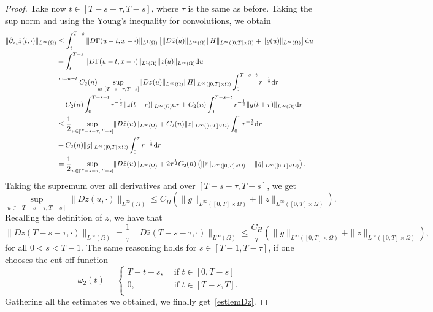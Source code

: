 \documentclass[10pt,a4paper,nouppercase,nowrite]{article}
\numberwithin{equation}{section}
\newcommand{\di}{{\rm d}}
\theoremstyle{definition}
\begin{document}
\begin{proof}
		Take now $t \in [T-s-\tau,T-s]$, where $\tau$ is the same as before. Taking the sup norm and using the Young's inequality for convolutions, we obtain
		\begin{equation*}
			\begin{split}
			\| \partial_{x_i} \bar{z}(t,\cdot) \|_{L^{\infty}(\Omega)} &\le \int_t^{T-s} \| D\Gamma(u-t,x-\cdot) \|_{L^1(\Omega)} \left[ \| D\bar{z}(u) \|_{L^{\infty}(\Omega)} \| H \|_{L^{\infty}([0,T] \times \Omega)} + \| g(u) \|_{L^{\infty}(\Omega)} \right] \di u \\
			&+\int_t^{T-s} \| D\Gamma(u-t,x-\cdot) \|_{L^1(\Omega)} \| z(u) \|_{L^{\infty}(\Omega)} \di u \\
			&\overset{r:=u-t}{=} C_2(n) \underset{u \in [T-s-\tau,T-s]}{\sup} \| D\bar{z}(u) \|_{L^{\infty}(\Omega)} \| H \|_{L^{\infty}([0,T] \times \Omega)} \int_0^{T-s-t} r^{-\frac{1}{2}} \di r \\
			&+C_2(n) \int_0^{T-s-t} r^{-\frac{1}{2}} \| z(t+r) \|_{L^{\infty}(\Omega)} \di r + C_2(n) \int_0^{T-s-t} r^{-\frac{1}{2}} \| g(t+r) \|_{L^{\infty}(\Omega)} \di r \\
			&\le \frac{1}{2} \underset{u \in [T-s-\tau,T-s]}{\sup} \| D\bar{z}(u) \|_{L^{\infty}(\Omega)} + C_2(n) \| z \|_{L^{\infty}([0,T] \times \Omega)} \int_0^{\tau} r^{-\frac{1}{2}} \di r \\
			&+ C_2(n) \| g \|_{L^{\infty}([0,T] \times \Omega)} \int_0^{\tau} r^{-\frac{1}{2}} \di r \\
			&= \frac{1}{2} \underset{u \in [T-s-\tau,T-s]}{\sup} \| D\bar{z}(u) \|_{L^{\infty}(\Omega)} +2 \tau^{\frac{1}{2}} C_2(n) \left( \| z \|_{L^{\infty}([0,T] \times \Omega)} + \| g \|_{L^{\infty}([0,T] \times \Omega)} \right).
			\end{split}
		\end{equation*}
		Taking the supremum over all derivatives and over $[T-s-\tau,T-s]$, we get
		$$\underset{u \in [T-s-\tau,T-s]}{\sup} \| D\bar{z}(u,\cdot) \|_{L^{\infty}(\Omega)} \le C_H \left( \| g \|_{L^{\infty}([0,T] \times \Omega)} + \| z \|_{L^{\infty}([0,T] \times \Omega)} \right).$$
		Recalling the definition of $\bar{z}$, we have that
		$$\| Dz(T-s-\tau,\cdot) \|_{L^{\infty}(\Omega)} = \frac{1}{\tau} \| D\bar{z}(T-s-\tau,\cdot) \|_{L^{\infty}(\Omega)} \le \frac{C_H}{\tau} \left( \| g \|_{L^{\infty}([0,T] \times \Omega)} + \| z \|_{L^{\infty}([0,T] \times \Omega)} \right),$$
		for all $0 < s < T-1$. The same reasoning holds for $s \in [T-1,T-\tau]$, if one chooses the cut-off function
		\begin{equation*}
			\omega_2(t)=
			\begin{cases}
				T-t-s,& \text{ if } t \in [0,T-s] \\
				0,& \text{ if } t \in [T-s,T]. \\
			\end{cases}
		\end{equation*}
		Gathering all the estimates we obtained, we finally get~\eqref{estlemDz}.
	\end{proof}
\end{document}
